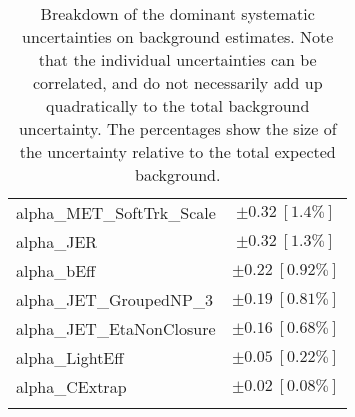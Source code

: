 \begin{table}
\begin{center}
\begin{tabular*}{\textwidth}{@{\extracolsep{\fill}}lc}
alpha\_MET\_SoftTrk\_Scale         & $\pm 0.32\ [1.4\%] $       \\
alpha\_JER         & $\pm 0.32\ [1.3\%] $       \\
alpha\_bEff         & $\pm 0.22\ [0.92\%] $       \\
alpha\_JET\_GroupedNP\_3         & $\pm 0.19\ [0.81\%] $       \\
alpha\_JET\_EtaNonClosure         & $\pm 0.16\ [0.68\%] $       \\
alpha\_LightEff         & $\pm 0.05\ [0.22\%] $       \\
alpha\_CExtrap         & $\pm 0.02\ [0.08\%] $       \\
\noalign{\smallskip}\hline\noalign{\smallskip}
\end{tabular*}
\end{center}
\caption[Breakdown of uncertainty on background estimates]{
Breakdown of the dominant systematic uncertainties on background estimates.
Note that the individual uncertainties can be correlated, and do not necessarily add up quadratically to 
the total background uncertainty. The percentages show the size of the uncertainty relative to the total expected background.
\label{table.results.bkgestimate.uncertainties.SRD_low}}
\end{table}
%
